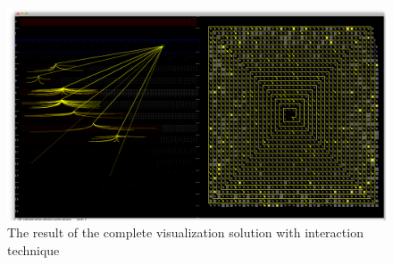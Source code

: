 \begin{figure}[h!]
\centering
\includegraphics[scale=0.33, angle=90]{pictures/complete_solution_overview.png}
\caption{The result of the complete visualization solution with interaction technique}
\label{fig:complete_solution_overview}
\end{figure}
